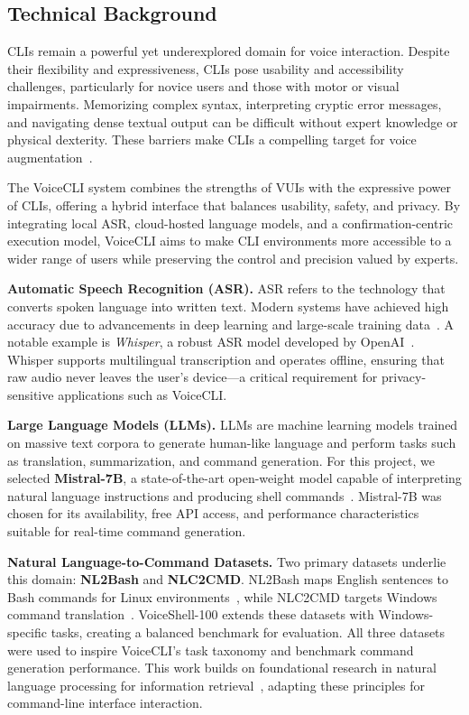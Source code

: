 \documentclass[a4paper,12pt]{article}
\begin{document}
\subsection{Technical Background}

CLIs remain a powerful yet underexplored domain for voice interaction. Despite their flexibility and expressiveness, CLIs pose usability and accessibility challenges, particularly for novice users and those with motor or visual impairments. Memorizing complex syntax, interpreting cryptic error messages, and navigating dense textual output can be difficult without expert knowledge or physical dexterity. These barriers make CLIs a compelling target for voice augmentation~\cite{ref2,ref4}.

The VoiceCLI system combines the strengths of VUIs with the expressive power of CLIs, offering a hybrid interface that balances usability, safety, and privacy. By integrating local ASR, cloud-hosted language models, and a confirmation-centric execution model, VoiceCLI aims to make CLI environments more accessible to a wider range of users while preserving the control and precision valued by experts.

\textbf{Automatic Speech Recognition (ASR).} ASR refers to the technology that converts spoken language into written text. Modern systems have achieved high accuracy due to advancements in deep learning and large-scale training data~\cite{ref5}. A notable example is \textit{Whisper}, a robust ASR model developed by OpenAI~\cite{ref10}. Whisper supports multilingual transcription and operates offline, ensuring that raw audio never leaves the user's device—a critical requirement for privacy-sensitive applications such as VoiceCLI.

\textbf{Large Language Models (LLMs).} LLMs are machine learning models trained on massive text corpora to generate human-like language and perform tasks such as translation, summarization, and command generation. For this project, we selected \textbf{Mistral-7B}, a state-of-the-art open-weight model capable of interpreting natural language instructions and producing shell commands~\cite{ref11}. Mistral-7B was chosen for its availability, free API access, and performance characteristics suitable for real-time command generation.

\textbf{Natural Language-to-Command Datasets.} Two primary datasets underlie this domain: \textbf{NL2Bash} and \textbf{NLC2CMD}. NL2Bash maps English sentences to Bash commands for Linux environments~\cite{ref26}, while NLC2CMD targets Windows command translation~\cite{ref27}. VoiceShell-100 extends these datasets with Windows-specific tasks, creating a balanced benchmark for evaluation. All three datasets were used to inspire VoiceCLI's task taxonomy and benchmark command generation performance. This work builds on foundational research in natural language processing for information retrieval~\cite{ref14}, adapting these principles for command-line interface interaction.
\end{document}
